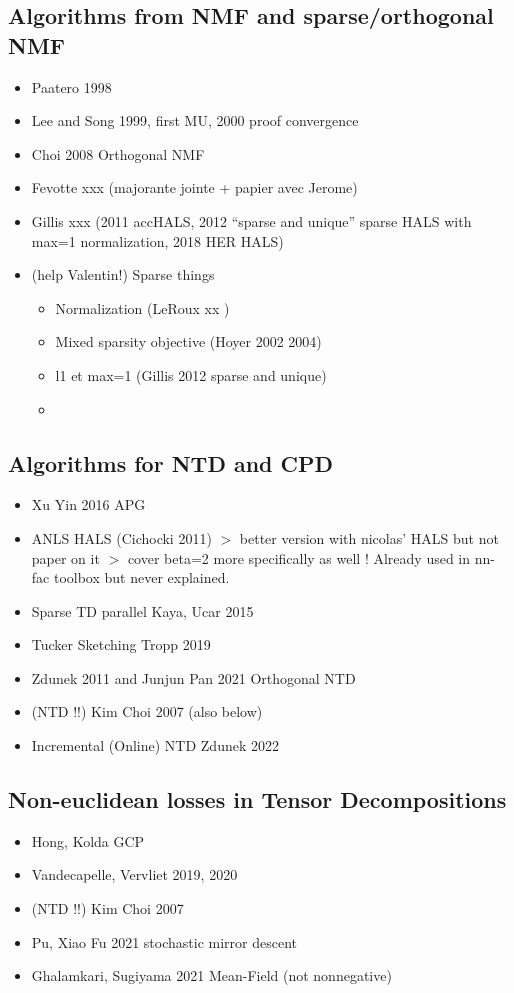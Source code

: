\documentclass[a4paper, 11pt]{article}
\begin{document}
\subsection{Algorithms from NMF and sparse/orthogonal NMF}
\begin{itemize}
    \item Paatero 1998
    \item Lee and Song 1999, first MU, 2000 proof convergence
    \item Choi 2008 Orthogonal NMF
    \item Fevotte xxx (majorante jointe + papier avec Jerome)
    \item Gillis xxx (2011 accHALS, 2012 ``sparse and unique'' sparse HALS with max=1 normalization, 2018 HER HALS)
    \item (help Valentin!)
    Sparse things
    \begin{itemize}
        \item Normalization (LeRoux  xx )
        \item Mixed sparsity objective (Hoyer 2002 2004)
        \item l1 et max=1 (Gillis 2012 sparse and unique)
        \item 
    \end{itemize}
\end{itemize}

\subsection{Algorithms for NTD and CPD}
\begin{itemize}
    \item Xu Yin 2016 APG
    \item ANLS HALS (Cichocki 2011) $>$ better version with nicolas' HALS but not paper on it $>$ cover beta=2 more specifically as well ! Already used in nn-fac toolbox but never explained.
    \item Sparse TD parallel Kaya, Ucar 2015
    \item Tucker Sketching Tropp 2019
    \item Zdunek 2011 and Junjun Pan 2021 Orthogonal NTD
    \item (NTD !!) Kim Choi 2007 (also below)
    \item Incremental (Online) NTD Zdunek 2022
\end{itemize}

\subsection{Non-euclidean losses in Tensor Decompositions}
\begin{itemize}
    \item Hong, Kolda GCP
    \item Vandecapelle, Vervliet 2019, 2020
    \item (NTD !!) Kim Choi 2007
    \item Pu, Xiao Fu 2021 stochastic mirror descent
    \item Ghalamkari, Sugiyama 2021 Mean-Field (not nonnegative)
\end{itemize}
\end{document}
